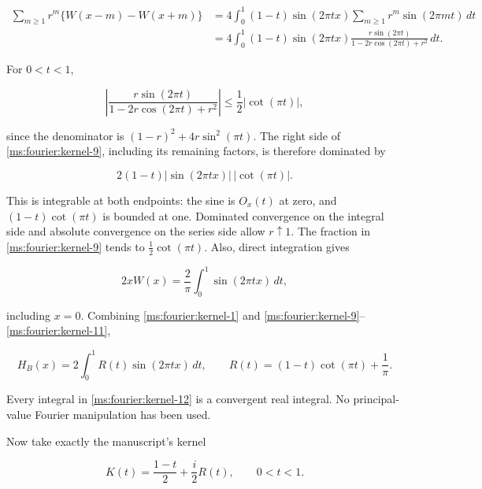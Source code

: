 \begin{equation}
 \begin{aligned}
 \sum_{m\ge1}r^m\{W(x-m)-W(x+m)\}
   &=4\int_0^1(1-t)\sin(2\pi tx)
               \sum_{m\ge1}r^m\sin(2\pi mt)\,dt\\
   &=4\int_0^1(1-t)\sin(2\pi tx)
        \frac{r\sin(2\pi t)}{1-2r\cos(2\pi t)+r^2}\,dt.
 \end{aligned}                                                    \label{ms:fourier:kernel-9}
\end{equation}

For \(0<t<1\),

\begin{equation}
 \left|\frac{r\sin(2\pi t)}{1-2r\cos(2\pi t)+r^2}\right|
 \le\frac12|\cot(\pi t)|,
 \label{ms:fourier:kernel-10}
\end{equation}

since the denominator is
\((1-r)^2+4r\sin^2(\pi t)\). The right side of \eqref{ms:fourier:kernel-9}, including its
remaining factors, is therefore dominated by

\[
 2(1-t)|\sin(2\pi tx)|\,|\cot(\pi t)|.
\]

This is integrable at both endpoints: the sine is \(O_x(t)\) at zero,
and \((1-t)\cot(\pi t)\) is bounded at one. Dominated convergence on
the integral side and absolute convergence on the series side allow
\(r\uparrow1\). The fraction in \eqref{ms:fourier:kernel-9} tends to
\(\tfrac12\cot(\pi t)\). Also, direct integration gives

\begin{equation}
 2xW(x)=\frac2\pi\int_0^1\sin(2\pi tx)\,dt,          \label{ms:fourier:kernel-11}
\end{equation}

including \(x=0\). Combining \eqref{ms:fourier:kernel-1} and \eqref{ms:fourier:kernel-9}--\eqref{ms:fourier:kernel-11},

\begin{equation}
 H_B(x)=2\int_0^1 R(t)\sin(2\pi tx)\,dt,
 \qquad R(t)=(1-t)\cot(\pi t)+\frac1\pi.
 \label{ms:fourier:kernel-12}
\end{equation}

Every integral in \eqref{ms:fourier:kernel-12} is a convergent real integral. No principal-value
Fourier manipulation has been used.

Now take exactly the manuscript's kernel

\begin{equation}
 K(t)=\frac{1-t}{2}+\frac i2 R(t),\qquad0<t<1.
 \label{ms:fourier:kernel-13}
\end{equation}

